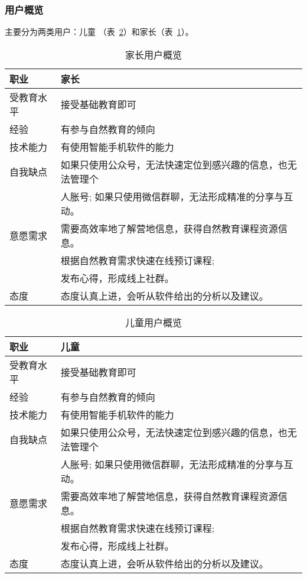 \subsubsection{用户概览}
主要分为两类用户：儿童 （表~\ref{tab:etyhgl}）和家长（表~\ref{tab:jzyhgl}）。
\begin{table}
\centering
    \begin{tabular}{|l|l|}
    \hline 职业 & 家长 \\
    \hline 受教育水平 & 接受基础教育即可 \\
    \hline 经验 & 有参与自然教育的倾向 \\
    \hline 技术能力 & 有使用智能手机软件的能力 \\
    \hline 自我缺点 & 如果只使用公众号，无法快速定位到感兴趣的信息，也无法管理个 \\
    & 人胀号; 如果只使用微信群聊，无法形成精准的分享与互动。 \\
    \hline 意愿需求 & 需要高效率地了解营地信息，获得自然教育课程资源信息。 \\
    & 根据自然教育需求快速在线预订课程; \\
    & 发布心得，形成线上社群。 \\
    \hline 态度 & 态度认真上进，会听从软件给出的分析以及建议。 \\
    \hline
    \end{tabular}
\caption{
家长用户概览
}
\label{tab:jzyhgl}
\end{table}

\begin{table}
\centering
    \begin{tabular}{|l|l|}
    \hline 职业 & 儿童 \\
    \hline 受教育水平 & 接受基础教育即可 \\
    \hline 经验 & 有参与自然教育的倾向 \\
    \hline 技术能力 & 有使用智能手机软件的能力 \\
    \hline 自我缺点 & 如果只使用公众号，无法快速定位到感兴趣的信息，也无法管理个 \\
    & 人胀号; 如果只使用微信群聊，无法形成精准的分享与互动。 \\
    \hline 意愿需求 & 需要高效率地了解营地信息，获得自然教育课程资源信息。 \\
    & 根据自然教育需求快速在线预订课程; \\
    & 发布心得，形成线上社群。 \\
    \hline 态度 & 态度认真上进，会听从软件给出的分析以及建议。 \\
    \hline
    \end{tabular}
\caption{
儿童用户概览
}
\label{tab:etyhgl}
\end{table}

